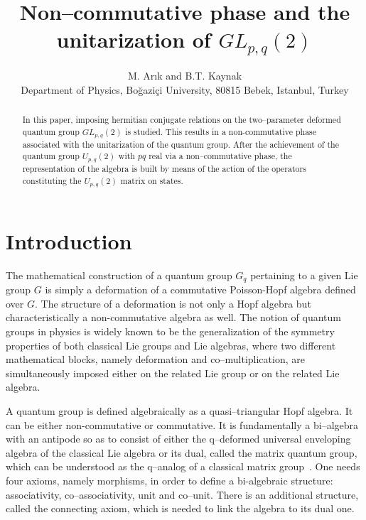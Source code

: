 \documentclass[a4paper,12pt]{article}
\numberwithin{equation}{section}
\begin{document}
\title{Non--commutative phase and the unitarization of
$GL_{p,q}\left(2\right)$}


\author{M. Ar\i k and B.T. Kaynak \\
{\small Department of Physics, Bo\u{g}azi\c{c}i University, 80815 Bebek, Istanbul, Turkey}}
\date{}
\maketitle

\begin{abstract}
In this paper, imposing hermitian conjugate relations on
 the two--parameter deformed quantum group $GL_{p,q}\left(2\right)$ is studied.
This results in a non-commutative phase associated with the unitarization of the
 quantum group. After the achievement of the quantum group $U_{p,q} \left( 2 \right)$
 with $pq$ real via a non--commutative phase, the representation of the algebra
 is built by means of the action of the operators constituting the
 $U_{p,q} \left( 2 \right)$ matrix on states.
\end{abstract}

\section{Introduction}\label{int}
The mathematical construction of a quantum group $G_{q}$ pertaining
 to a given Lie group $G$ is simply a deformation of a commutative
 Poisson-Hopf algebra defined over $G$. The structure of a deformation
 is not only a Hopf algebra but characteristically a non-commutative
 algebra as well. The notion of quantum groups in physics is widely
 known to be the generalization of the symmetry properties of both
 classical Lie groups and Lie algebras, where two different mathematical
 blocks, namely deformation and co--multiplication, are simultaneously
 imposed either on the related Lie group or on the related Lie algebra.

A quantum group is defined algebraically as a quasi--triangular Hopf algebra.
 It can be either non-commutative or commutative. It is fundamentally a
 bi--algebra with an antipode so as to consist of either the q--deformed
 universal enveloping algebra of the classical Lie algebra or its dual,
 called the matrix quantum group, which can be understood as the q--analog
 of a classical matrix group~\cite{Bie}. One needs four axioms, namely morphisms,
 in order to define a bi-algebraic structure: associativity, co--associativity, unit
 and co--unit. There is an additional structure, called the connecting axiom,
 which is needed to link the algebra to its dual one.
\end{document}
